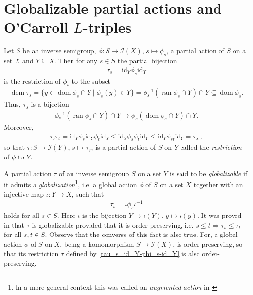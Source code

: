\documentclass[reqno]{amsart}
\theoremstyle{definition}
\newcommand{\impl}{\Rightarrow}
\newcommand{\id}{\mathrm{id}}
\newcommand{\cI}[1]{\mathcal I{(#1)}}
\newcommand{\dom}[1]{\operatorname{\mathrm{dom}}{#1}}
\newcommand{\ran}[1]{\operatorname{\mathrm{ran}}{#1}}
\newcommand{\m}{{}^{-1}}
\newcommand{\0}{\theta}
\newcommand{\io}{\iota}
\newcommand{\sst}{\subseteq}
\begin{document}
\section{Globalizable partial actions and O'Carroll $L$-triples}\label{glob-sec}
Let $S$ be an inverse semigroup, $\phi:S\to\cI X$, $s\mapsto\phi_s$, a partial action of $S$ on a set $X$ and $Y\sst X$. Then for any $s\in S$ the partial bijection
\begin{align}\label{tau_s=id_Y-phi_s-id_Y}
\tau_s=\id_Y\phi_s\id_Y
\end{align}
is the restriction of $\phi_s$ to the subset 
\begin{align}\label{dom-restr-phi_s}
\dom{\tau_s}=\{y\in \dom{\phi_s}\cap Y\mid \phi_s(y)\in Y\}=\phi\m_s(\ran{\phi_s}\cap Y)\cap Y\sst\dom{\phi_s}.
\end{align}
Thus, $\tau_s$ is a bijection 
\begin{align*}%
\phi\m_s(\ran{\phi_s}\cap Y)\cap Y\to \phi_s(\dom{\phi_s}\cap Y)\cap Y.
\end{align*}
Moreover, 
\begin{align*}
\tau_s\tau_t=\id_Y\phi_s\id_Y\phi_t\id_Y\le\id_Y\phi_s\phi_t\id_Y\le\id_Y\phi_{st}\id_Y=\tau_{st},
\end{align*}
so that $\tau:S\to\cI Y$, $s\mapsto\tau_s$, is a partial action of $S$ on $Y$ called the \emph{restriction} of $\phi$ to $Y$.

A partial action $\tau$ of an inverse semigroup $S$ on a set $Y$ is said to be \emph{globalizable} if it admits a \emph{globalization}\footnote{In a more general context this was called an \emph{augmented action} in \cite{Gould-Hollings09}}, i.e. a global action $\phi$ of $S$ on a set $X$ together with an injective map $\io:Y\to X$, such that
\begin{align}\label{tau_s=i^(-1)-phi_s-i}
\tau_s=\bar\io\phi_s\bar{\io}\m
\end{align}
holds for all $s\in S$. Here $\bar{\io}$ is the bijection $Y\to\io(Y)$, $y\mapsto\io(y)$. It was proved in \cite[Theorem 6.10]{Gould-Hollings09} that $\tau$ is globalizable provided that it is order-preserving, i.e. $s\le t\impl\tau_s\le\tau_t$ for all $s,t\in S$. Observe that the converse of this fact is also true. For, a global action $\phi$ of $S$ on $X$, being a homomorphism $S\to\cI X$, is order-preserving, so that its restriction $\tau$ defined by \eqref{tau_s=id_Y-phi_s-id_Y} is also order-preserving.
\end{document}
